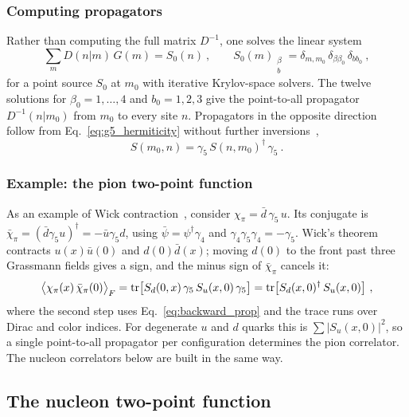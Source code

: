 \subsubsection{Computing propagators}
Rather than computing the full matrix $D^{-1}$, one solves the linear system~\cite{Gattringer:2010zz}
\begin{equation}
    \sum_{m}D(n|m)\,G(m)=S_0(n) \ , \qquad S_0(m)_{\substack{\beta\\b}}=\delta_{m,m_0}\,\delta_{\beta\beta_0}\,\delta_{bb_0} \ ,
    \label{eq:point_source}
\end{equation}
for a point source $S_0$ at $m_0$ with iterative Krylov-space solvers. The twelve solutions for $\beta_0=1,\ldots,4$ and $b_0=1,2,3$ give the point-to-all propagator $D^{-1}(n|m_0)$ from $m_0$ to every site $n$. Propagators in the opposite direction follow from Eq.~\eqref{eq:g5_hermiticity} without further inversions~\cite{Gattringer:2010zz},
\begin{equation}
    S(m_0,n)=\gamma_5\,S(n,m_0)^\dagger\,\gamma_5 \ .
    \label{eq:backward_prop}
\end{equation}

\subsubsection{Example: the pion two-point function}
As an example of Wick contraction~\cite{Gattringer:2010zz,Lin:2014}, consider $\chi_\pi=\bar d\,\gamma_5\,u$. Its conjugate is $\bar\chi_\pi=(\bar d\gamma_5 u)^\dagger=-\bar u\gamma_5 d$, using $\bar\psi=\psi^\dagger\gamma_4$ and $\gamma_4\gamma_5\gamma_4=-\gamma_5$. Wick's theorem contracts $u(x)\bar u(0)$ and $d(0)\bar d(x)$; moving $d(0)$ to the front past three Grassmann fields gives a sign, and the minus sign of $\bar\chi_\pi$ cancels it:
\begin{equation}
    \big\langle\chi_\pi(x)\,\bar\chi_\pi(0)\big\rangle_F=\mathrm{tr}\big[S_d(0,x)\,\gamma_5\,S_u(x,0)\,\gamma_5\big]=\mathrm{tr}\big[S_d(x,0)^\dagger\,S_u(x,0)\big] \ ,
    \label{eq:pion_contraction}
\end{equation}
where the second step uses Eq.~\eqref{eq:backward_prop} and the trace runs over Dirac and color indices. For degenerate $u$ and $d$ quarks this is $\sum|S_u(x,0)|^2$, so a single point-to-all propagator per configuration determines the pion correlator. The nucleon correlators below are built in the same way.

\subsection{The nucleon two-point function}
\label{sec:lat_2pt}

